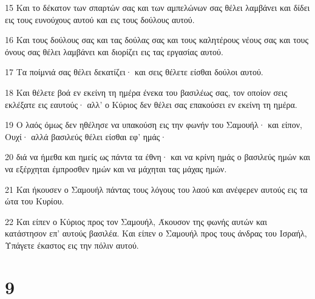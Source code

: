 \par 15 Και το δέκατον των σπαρτών σας και των αμπελώνων σας θέλει λαμβάνει και δίδει εις τους ευνούχους αυτού και εις τους δούλους αυτού.
\par 16 Και τους δούλους σας και τας δούλας σας και τους καλητέρους νέους σας και τους όνους σας θέλει λαμβάνει και διορίζει εις τας εργασίας αυτού.
\par 17 Τα ποίμνιά σας θέλει δεκατίζει· και σεις θέλετε είσθαι δούλοι αυτού.
\par 18 Και θέλετε βοά εν εκείνη τη ημέρα ένεκα του βασιλέως σας, τον οποίον σεις εκλέξατε εις εαυτούς· αλλ' ο Κύριος δεν θέλει σας επακούσει εν εκείνη τη ημέρα.
\par 19 Ο λαός όμως δεν ηθέλησε να υπακούση εις την φωνήν του Σαμουήλ· και είπον, Ουχί· αλλά βασιλεύς θέλει είσθαι εφ' ημάς·
\par 20 διά να ήμεθα και ημείς ως πάντα τα έθνη· και να κρίνη ημάς ο βασιλεύς ημών και να εξέρχηται έμπροσθεν ημών και να μάχηται τας μάχας ημών.
\par 21 Και ήκουσεν ο Σαμουήλ πάντας τους λόγους του λαού και ανέφερεν αυτούς εις τα ώτα του Κυρίου.
\par 22 Και είπεν ο Κύριος προς τον Σαμουήλ, Άκουσον της φωνής αυτών και κατάστησον επ' αυτούς βασιλέα. Και είπεν ο Σαμουήλ προς τους άνδρας του Ισραήλ, Υπάγετε έκαστος εις την πόλιν αυτού.

\chapter{9}

